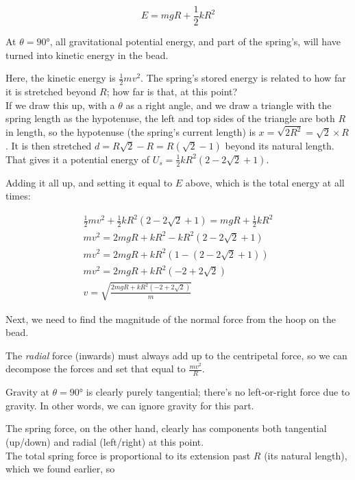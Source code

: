 \documentclass[8.01x]{subfiles}
\begin{document}
\begin{equation}
E = m g R + \frac{1}{2} k R^2
\end{equation}

At $\theta = \ang{90}$, all gravitational potential energy, and part of the spring's, will have turned into kinetic energy in the bead.

Here, the kinetic energy is $\frac{1}{2} m v^2$. The spring's stored energy is related to how far it is stretched beyond $R$; how far is that, at this point?\\
If we draw this up, with a $\theta$ as a right angle, and we draw a triangle with the spring length as the hypotenuse, the left and top sides of the triangle are both $R$ in length, so the hypotenuse (the spring's current length) is $x = \sqrt{2 R^2} = \sqrt{2} \times R$.
It is then stretched $d = R \sqrt{2} - R = R(\sqrt{2} - 1)$ beyond its natural length. That gives it a potential energy of $U_s = \frac{1}{2} k R^2(2 - 2 \sqrt{2} + 1)$.

Adding it all up, and setting it equal to $E$ above, which is the total energy at all times:

\begin{align}
\frac{1}{2} m v^2 + \frac{1}{2} k R^2(2 - 2 \sqrt{2} + 1) = m g R + \frac{1}{2} k R^2\\
m v^2 = 2 m g R + k R^2 - k R^2(2 - 2 \sqrt{2} + 1)\\
m v^2 = 2 m g R + k R^2 (1 - (2 - 2 \sqrt{2} + 1))\\
m v^2 = 2 m g R + k R^2 (-2 + 2 \sqrt{2})\\
v = \sqrt{\frac{2 m g R + k R^2 (-2 + 2 \sqrt{2})}{m}}
\end{align}

Next, we need to find the magnitude of the normal force from the hoop on the bead.

The \emph{radial} force (inwards) must always add up to the centripetal force, so we can decompose the forces and set that equal to $\frac{m v^2}{R}$.

Gravity at $\theta = \ang{90}$ is clearly purely tangential; there's no left-or-right force due to gravity. In other words, we can ignore gravity for this part.

The spring force, on the other hand, clearly has components both tangential (up/down) and radial (left/right) at this point.\\
The total spring force is proportional to its extension past $R$ (its natural length), which we found earlier, so
\end{document}
